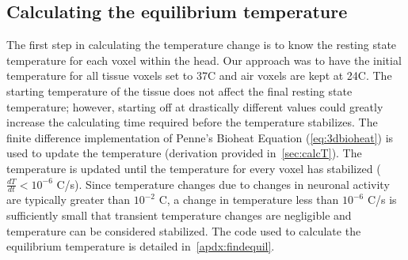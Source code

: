   
    \subsection{\label{sec:calcequilT} Calculating the equilibrium temperature}
  The first step in calculating the temperature change is to know the resting state temperature for each voxel within the head. Our approach was to have the initial temperature for all tissue voxels set to 37\degree C and air voxels are kept at 24\degree C.  The starting temperature of the tissue does not affect the final resting state temperature; however, starting off at drastically different values could greatly increase the calculating time required before the temperature stabilizes. The finite difference implementation of Penne's Bioheat Equation (\cref{eq:3dbioheat}) is used to update the temperature (derivation provided in~\cref{sec:calcT}).  The temperature is updated until the temperature for every voxel has stabilized ($\frac{dT}{dt} < 10^{-6}$ \degree C/s).  Since temperature changes due to changes in neuronal activity are typically greater than $10^{-2}$ \degree C, a change in temperature less than $10^{-6}$ \degree C/s is sufficiently small that transient temperature changes are negligible and temperature can be considered stabilized.  The code used to calculate the equilibrium temperature is detailed in~\cref{apdx:findequil}.
  
